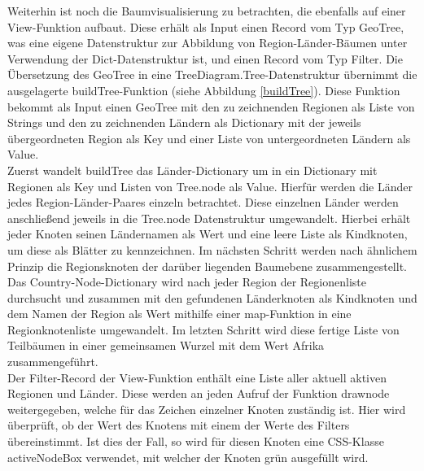 \documentclass[usegeometry=true]{scrartcl}
\begin{document}
Weiterhin ist noch die Baumvisualisierung zu betrachten, die ebenfalls auf einer View-Funktion aufbaut. Diese erhält als Input einen Record vom Typ GeoTree, was eine eigene Datenstruktur zur Abbildung von Region-Länder-Bäumen unter Verwendung der Dict-Datenstruktur ist, und einen Record vom Typ Filter. Die Übersetzung des GeoTree in eine TreeDiagram.Tree-Datenstruktur übernimmt die ausgelagerte buildTree-Funktion (siehe Abbildung \ref{buildTree}). Diese Funktion bekommt als Input einen GeoTree mit den zu zeichnenden Regionen als Liste von Strings und den zu zeichnenden Ländern als Dictionary mit der jeweils übergeordneten Region als Key und einer Liste von untergeordneten Ländern als Value.\\ Zuerst wandelt buildTree das Länder-Dictionary um in ein Dictionary mit Regionen als Key und Listen von Tree.node als Value. Hierfür werden die Länder jedes Region-Länder-Paares einzeln betrachtet. Diese einzelnen Länder werden anschließend jeweils in die Tree.node Datenstruktur umgewandelt. Hierbei erhält jeder Knoten seinen Ländernamen als Wert und eine leere Liste als Kindknoten, um diese als Blätter zu kennzeichnen. Im nächsten Schritt werden nach ähnlichem Prinzip die Regionsknoten der darüber liegenden Baumebene zusammengestellt. Das Country-Node-Dictionary wird nach jeder Region der Regionenliste durchsucht und zusammen mit den gefundenen Länderknoten als Kindknoten und dem Namen der Region als Wert mithilfe einer map-Funktion in eine Regionknotenliste umgewandelt. Im letzten Schritt wird diese fertige Liste von Teilbäumen in einer gemeinsamen Wurzel mit dem Wert \glqq Afrika\grqq{} zusammengeführt.\\ Der Filter-Record der View-Funktion enthält eine Liste aller aktuell aktiven Regionen und Länder. Diese werden an jeden Aufruf der Funktion \glqq drawnode\grqq{} weitergegeben, welche für das Zeichen einzelner Knoten zuständig ist. Hier wird überprüft, ob der Wert des Knotens mit einem der Werte des Filters übereinstimmt. Ist dies der Fall, so wird für diesen Knoten eine CSS-Klasse \glqq activeNodeBox\grqq{} verwendet, mit welcher der Knoten grün ausgefüllt wird.\\
\end{document}
